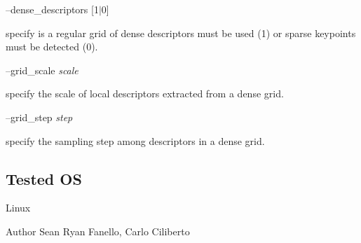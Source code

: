 --dense\+\_\+descriptors {\itshape }\mbox{[}1$\vert$0\mbox{]}
\begin{DoxyItemize}
\item specify is a regular grid of dense descriptors must be used (1) or sparse keypoints must be detected (0).
\end{DoxyItemize}

--grid\+\_\+scale {\itshape scale} 
\begin{DoxyItemize}
\item specify the scale of local descriptors extracted from a dense grid.
\end{DoxyItemize}

--grid\+\_\+step {\itshape step} 
\begin{DoxyItemize}
\item specify the sampling step among descriptors in a dense grid.
\end{DoxyItemize}\hypertarget{group__icub__sparseCoder_tested_os_sec}{}\subsection{Tested OS}\label{group__icub__sparseCoder_tested_os_sec}
Linux

\begin{DoxyAuthor}{Author}
Sean Ryan Fanello, Carlo Ciliberto 
\end{DoxyAuthor}
